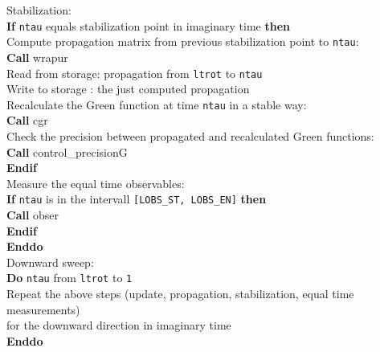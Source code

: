 \begin{mdframed}[frametitle={Basic structure of the auxiliary field QMC implementation (\path{Prog/main.f90}):}]
{\hspace*{3em}  Stabilization: \\     
\hspace*{3em} \textbf{If} \texttt{ntau} equals stabilization point in imaginary time \textbf{then}\\
\hspace*{4em} Compute propagation matrix from previous stabilization point to \texttt{ntau}: \\
\hspace*{4em} \textbf{Call} wrapur\\
\hspace*{4em} Read from storage: propagation from \texttt{ltrot} to \texttt{ntau}\\
\hspace*{4em} Write to storage : the just computed propagation \\
\hspace*{4em} Recalculate the Green function at time \texttt{ntau} in a stable way:\\
\hspace*{4em} \textbf{Call} cgr\\            
\hspace*{4em} Check the precision between propagated and recalculated Green functions:\\
\hspace*{4em} \textbf{Call} control\_precisionG\\
\hspace*{3em} \textbf{Endif}\\
    
\hspace*{3em} Measure the equal time observables: \\
\hspace*{3em} \textbf{If} \texttt{ntau} is in the intervall \texttt{[LOBS\_ST, LOBS\_EN]} \textbf{then}\\
\hspace*{4em} \textbf{Call} obser\\
\hspace*{3em} \textbf{Endif}\\
\hspace*{2em} \textbf{Enddo}\\

\hspace*{2em} Downward sweep:\\
\hspace*{2em} \textbf{Do} \texttt{ntau} from \texttt{ltrot} to \texttt{1}\\
\hspace*{3em} Repeat the above steps (update, propagation, stabilization, equal time measurements) \\
\hspace*{3em} for the downward direction in imaginary time\\
\hspace*{2em} \textbf{Enddo}\\

}
\end{mdframed}
